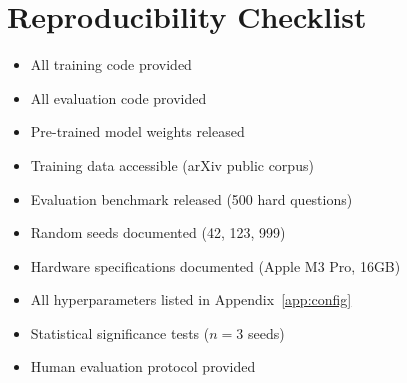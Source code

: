 \documentclass[11pt,a4paper]{article}
\theoremstyle{plain}
\theoremstyle{definition}
\begin{document}
\section{Reproducibility Checklist}
\label{app:reproducibility}

\begin{itemize}[leftmargin=*]
    \item[$\square$] All training code provided
    \item[$\square$] All evaluation code provided
    \item[$\square$] Pre-trained model weights released
    \item[$\square$] Training data accessible (arXiv public corpus)
    \item[$\square$] Evaluation benchmark released (500 hard questions)
    \item[$\square$] Random seeds documented (42, 123, 999)
    \item[$\square$] Hardware specifications documented (Apple M3 Pro, 16GB)
    \item[$\square$] All hyperparameters listed in Appendix~\ref{app:config}
    \item[$\square$] Statistical significance tests ($n=3$ seeds)
    \item[$\square$] Human evaluation protocol provided
\end{itemize}
\end{document}
